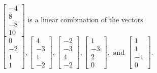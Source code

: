 \begin{exercise}
\begin{exerciseStatement}
  \end{exerciseStatement}
  \begin{exerciseAnswer}
   \(\left[\begin{array}{c}
-4 \\
8 \\
-8 \\
10
\end{array}\right]\) 
  	 is  
	a linear combination of the vectors \(\left[\begin{array}{c}
0 \\
-2 \\
1 \\
1
\end{array}\right] , \left[\begin{array}{c}
4 \\
-3 \\
1 \\
-2
\end{array}\right] , \left[\begin{array}{c}
-2 \\
-3 \\
4 \\
-2
\end{array}\right] , \left[\begin{array}{c}
1 \\
-3 \\
2 \\
0
\end{array}\right] , \text{ and } \left[\begin{array}{c}
1 \\
1 \\
-1 \\
0
\end{array}\right]\).

	
  


  \end{exerciseAnswer}
\end{exercise}